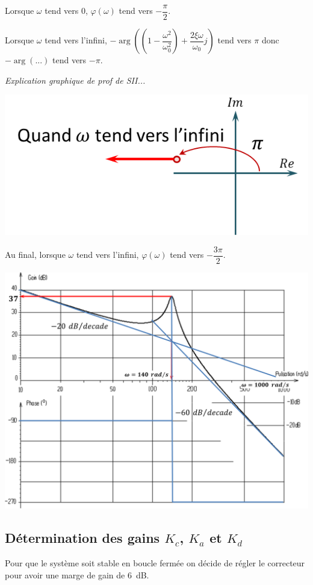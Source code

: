 \documentclass[10pt,fleqn]{article} %
\begin{document}
\begin{multicols}{2}
\begin{corrige}
Lorsque $\omega$ tend vers 0, $\varphi\left(\omega\right)$ 
tend vers $-\dfrac{\pi}{2}$. 

Lorsque $\omega$ tend vers l'infini,
$-\arg  \left( \left( 1 - \dfrac{\omega^2}{\omega_0^2}\right) + \dfrac{2\xi\omega}{\omega_0} j \right)$ tend vers $\pi$ donc $-\arg(...)$ tend vers $-\pi$.

\textit{Explication graphique de prof de SII...}
\begin{center}
\includegraphics[width=.6\linewidth]{images/cor_02}
\end{center}

Au final, lorsque $\omega$ tend vers l'infini, $\varphi(\omega)$ tend vers $-\dfrac{3\pi}{2}$.

\end{corrige} 

\begin{center}
\includegraphics[width=.8\linewidth]{images/cor_03}
\end{center}

\else \fi




\subsection*{Détermination des gains $K_c$, $K_a$ et $K_d$}
\ifprof
\else
Pour que le système soit stable en boucle fermée on décide de régler le correcteur pour avoir une marge de gain de \SI{6}{dB}.
\fi


\end{multicols}
\end{document}
